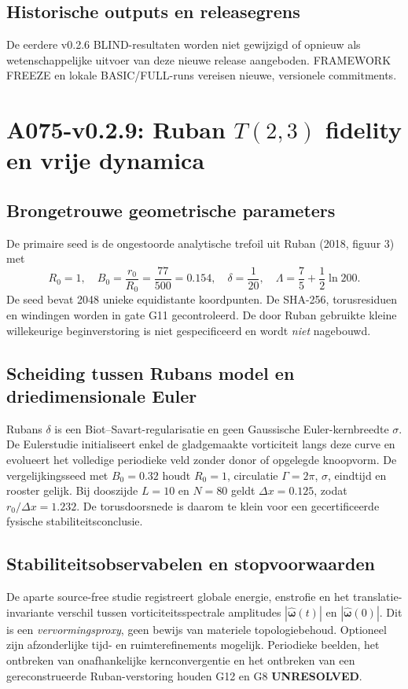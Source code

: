 \documentclass[10pt,a4paper]{article}
\begin{document}
\subsection{Historische outputs en releasegrens}
De eerdere v0.2.6 BLIND-resultaten worden niet gewijzigd of opnieuw als
wetenschappelijke uitvoer van deze nieuwe release aangeboden. FRAMEWORK
FREEZE en lokale BASIC/FULL-runs vereisen nieuwe, versionele commitments.

\section{A075-v0.2.9: Ruban $T(2,3)$ fidelity en vrije dynamica}
\subsection{Brongetrouwe geometrische parameters}
De primaire seed is de ongestoorde analytische trefoil uit Ruban (2018, figuur 3) met
\begin{equation}
R_0=1,\quad B_0=\frac{r_0}{R_0}=\frac{77}{500}=0.154,\quad
\delta=\frac1{20},\quad \Lambda=\frac75+\frac12\ln200.
\end{equation}
De seed bevat 2048 unieke equidistante koordpunten. De SHA-256, torusresiduen en windingen
worden in gate G11 gecontroleerd. De door Ruban gebruikte kleine willekeurige beginverstoring
is niet gespecificeerd en wordt \emph{niet} nagebouwd.
\subsection{Scheiding tussen Rubans model en driedimensionale Euler}
Rubans $\delta$ is een Biot--Savart-regularisatie en geen Gaussische Euler-kernbreedte $\sigma$.
De Eulerstudie initialiseert enkel de gladgemaakte vorticiteit langs deze curve en evolueert
het volledige periodieke veld zonder donor of opgelegde knoopvorm.
De vergelijkingsseed met $B_0=0.32$ houdt $R_0=1$, circulatie $\Gamma=2\pi$, $\sigma$, eindtijd en
rooster gelijk. Bij dooszijde $L=10$ en $N=80$ geldt $\Delta x=0.125$, zodat
$r_0/\Delta x=1.232$. De torusdoorsnede is daarom te klein voor een gecertificeerde
fysische stabiliteitsconclusie.
\subsection{Stabiliteitsobservabelen en stopvoorwaarden}
De aparte source-free studie registreert globale energie, enstrofie en
het translatie-invariante verschil tussen vorticiteitsspectrale amplitudes
$|\widehat{\boldsymbol\omega}(t)|$ en $|\widehat{\boldsymbol\omega}(0)|$.
Dit is een \emph{vervormingsproxy}, geen bewijs van materiele topologiebehoud.
Optioneel zijn afzonderlijke tijd- en ruimterefinements mogelijk. Periodieke beelden,
het ontbreken van onafhankelijke kernconvergentie en het ontbreken van een gereconstrueerde
Ruban-verstoring houden G12 en G8 \textbf{UNRESOLVED}.
\end{document}
